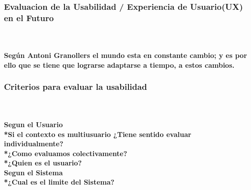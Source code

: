 \documentclass[10pt]{beamer}
\theoremstyle{remark}
\theoremstyle{definition}
\begin{document}
\begin{frame}[allowframebreaks]
    \frametitle{Evaluacion de la Usabilidad / Experiencia de Usuario(UX) en el Futuro}\\
    \paragraph{
    Según Antoni Granollers el mundo esta en constante cambio; y es por ello que se tiene que lograrse adaptarse a tiempo, a estos cambios.
    }
\end{frame}


\begin{frame}[allowframebreaks]
    \frametitle{Criterios para evaluar la usabilidad}\\
    \paragraph{
    \textbf{Segun el Usuario}\\ 
    \hfill \break
        *{{Si el contexto es multiusuario ¿Tiene sentido evaluar individualmente?}}\\
        *{{¿Como evaluamos colectivamente?}}\\
        *{{¿Quien es el usuario?}}\\
    \hfill \break
    \textbf{Segun el Sistema}\\ 
    \hfill \break
        *{{¿Cual es el limite del Sistema?}}\\
    }
\end{frame}
\end{document}
